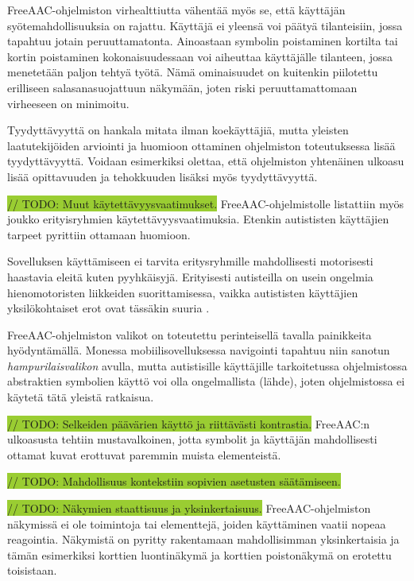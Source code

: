 \documentclass[utf8]{gradu3}
\begin{document}
FreeAAC-ohjelmiston virhealttiutta vähentää myös se, että käyttäjän syötemahdollisuuksia on rajattu. Käyttäjä ei yleensä voi päätyä tilanteisiin, jossa tapahtuu jotain peruuttamatonta. Ainoastaan symbolin poistaminen kortilta tai kortin poistaminen kokonaisuudessaan voi aiheuttaa käyttäjälle tilanteen, jossa menetetään paljon tehtyä työtä. Nämä ominaisuudet on kuitenkin piilotettu erilliseen salasanasuojattuun näkymään, joten riski peruuttamattomaan virheeseen on minimoitu.

Tyydyttävyyttä on hankala mitata ilman koekäyttäjiä, mutta yleisten laatutekijöiden arviointi ja huomioon ottaminen ohjelmiston toteutuksessa lisää tyydyttävyyttä. Voidaan esimerkiksi olettaa, että ohjelmiston yhtenäinen ulkoasu lisää opittavuuden ja tehokkuuden lisäksi myös tyydyttävyyttä.

\colorbox{YellowGreen}{// TODO: Muut käytettävyysvaatimukset.}
FreeAAC-ohjelmistolle listattiin myös joukko erityisryhmien käytettävyysvaatimuksia. Etenkin autististen käyttäjien tarpeet pyrittiin ottamaan huomioon.

Sovelluksen käyttämiseen ei tarvita eritysryhmille mahdollisesti motorisesti haastavia eleitä kuten pyyhkäisyjä. Erityisesti autisteilla on usein ongelmia hienomotoristen liikkeiden suorittamisessa, vaikka autististen käyttäjien yksilökohtaiset erot ovat tässäkin suuria \parencite[]{motor-skills-autism}.

FreeAAC-ohjelmiston valikot on toteutettu perinteisellä tavalla painikkeita hyödyntämällä. Monessa mobiilisovelluksessa navigointi tapahtuu niin sanotun \textit{hampurilaisvalikon} avulla, mutta autistisille käyttäjille tarkoitetussa ohjelmistossa abstraktien symbolien käyttö voi olla ongelmallista (lähde), joten ohjelmistossa ei käytetä tätä yleistä ratkaisua.

\colorbox{YellowGreen}{// TODO: Selkeiden päävärien käyttö ja riittävästi kontrastia.}
FreeAAC:n ulkoasusta tehtiin mustavalkoinen, jotta symbolit ja käyttäjän mahdollisesti ottamat kuvat erottuvat paremmin muista elementeistä.

\colorbox{YellowGreen}{// TODO: Mahdollisuus kontekstiin sopivien asetusten säätämiseen.}
  
\colorbox{YellowGreen}{// TODO: Näkymien staattisuus ja yksinkertaisuus.}
FreeAAC-ohjelmiston näkymissä ei ole toimintoja tai elementtejä, joiden käyttäminen vaatii nopeaa reagointia. Näkymistä on pyritty rakentamaan mahdollisimman yksinkertaisia ja tämän esimerkiksi korttien luontinäkymä ja korttien poistonäkymä on erotettu toisistaan.
\end{document}
